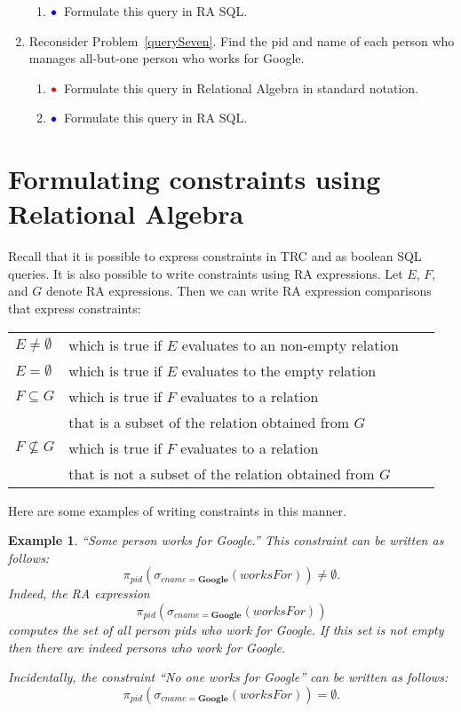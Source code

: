\documentclass[11pt]{article}
\newcommand{\red}[1]{{\color{red}#1}}
\newcommand{\blue}[1]{{\color{blue}#1}}
\newcommand{\redbullet}{$\red{\bullet}$}
\newcommand{\bluebullet}{$\blue{\bullet}$}
\newtheorem{example}{Example}
\begin{document}
\begin{enumerate}[resume]
\begin{enumerate}
\item   \bluebullet\ Formulate this query in RA SQL.

\end{enumerate}

\item Reconsider Problem~\ref{querySeven}. Find the pid and name of each person who manages all-but-one person who works for Google.
\begin{enumerate}
\item  \redbullet\ Formulate this query in Relational Algebra in standard notation.


\item  \bluebullet\  Formulate this query in RA SQL.

\end{enumerate}
\end{enumerate}

\newpage
\section{Formulating constraints using Relational Algebra}

Recall that it is possible to express constraints in TRC and as boolean SQL queries.
It is also possible to write constraints using RA expressions.
Let $E$, $F$, and $G$  denote RA expressions. Then we can write RA expression comparisons that express constraints:
\begin{center}
\begin{tabular}{llll}
$E \not=\emptyset$ & which is true if $E$ evaluates to an \blue{non-empty} relation \\
$E = \emptyset$ & which is true if $E$ evaluates to the \blue{empty} relation \\
$F \subseteq G$ & which is true if $F$ evaluates to a relation \\
&that is a \blue{subset} of the relation obtained from $G$\\ 
$F \not\subseteq G$ & which is true if $F$ evaluates to a relation \\
&that is \blue{not} a \blue{subset} of the relation obtained from $G$\\ 
\end{tabular}
\end{center}

Here are some examples of writing constraints in this manner.

\begin{example}\label{constraintOne}
``\emph{Some person works for Google}.''  This constraint can be written as follows:
\[\pi_{pid}(\sigma_{cname = \mathbf{Google}}(worksFor)) \neq \emptyset.
\]
Indeed,  the RA expression \[\pi_{pid}(\sigma_{cname = \mathbf{Google}}(worksFor))\]
computes the set of all person pids who work for Google.   If this set is not empty then there
are indeed persons who work for Google.

Incidentally, the constraint ``\emph{No one works for Google}'' can be written as follows:
\[\pi_{pid}(\sigma_{cname = \mathbf{Google}}(worksFor)) = \emptyset.
\]
\end{example}
\end{document}
